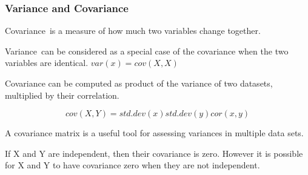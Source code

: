 \begin{frame}
\frametitle{Variance and Covariance}
Covariance is a measure of how much two variables change together. 

Variance can be considered as a special case of the covariance when the two variables are identical.
$var(x) = cov(X,X)$

Covariance can be computed as product of the variance of two datasets, multiplied by their correlation.

\[
cov(X,Y) = std.dev (x) std.dev(y) cor(x,y)
\]

A covariance matrix is a useful tool for assessing variances in multiple data sets.


If X and Y are independent, then their covariance is zero. However it is possible for X and Y to have covariance zero when they are not independent.


\end{frame}


